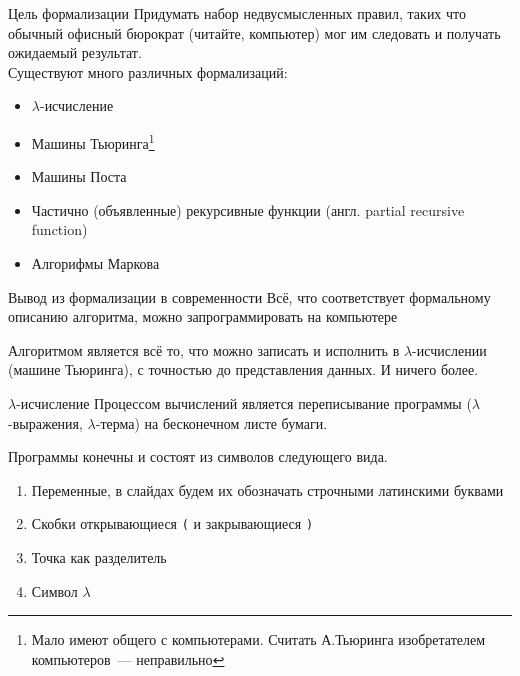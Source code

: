 \begin{frame}{Цель формализации}
Придумать набор недвусмысленных правил, таких что обычный офисный бюрократ (читайте, компьютер) мог им следовать и получать ожидаемый результат.\\

\vspace{1em}
Существуют много различных формализаций:
\begin{itemize}
\item $\lambda$-исчисление
\item Машины Тьюринга\footnote{Мало имеют общего с компьютерами. Считать А.Тьюринга изобретателем компьютеров~--- неправильно}
\item Машины Поста
\item Частично (объявленные) рекурсивные функции (англ. partial recursive function)
\item Алгорифмы Маркова
\end{itemize}
\end{frame}


\begin{frame}{Вывод из формализации в современности}
Всё, что соответствует формальному описанию алгоритма, можно запрограммировать на компьютере

\begin{definition}
Алгоритмом является всё то, что можно записать и исполнить в $\lambda$-исчислении (машине Тьюринга), с точностью до представления данных. И ничего более.
\end{definition}

\end{frame}


\begin{frame}{$\lambda$-исчисление}
Процессом вычислений является переписывание программы ($\lambda$-выражения, $\lambda$-терма) на бесконечном листе бумаги.

\vspace{1em}
Программы конечны и состоят из символов следующего вида.
\begin{enumerate}
\item Переменные, в слайдах будем их обозначать строчными латинскими буквами
\item Скобки открывающиеся \texttt{(} и закрывающиеся \texttt{)}
\item Точка как разделитель
\item Символ $\lambda$
\end{enumerate}
\end{frame}


